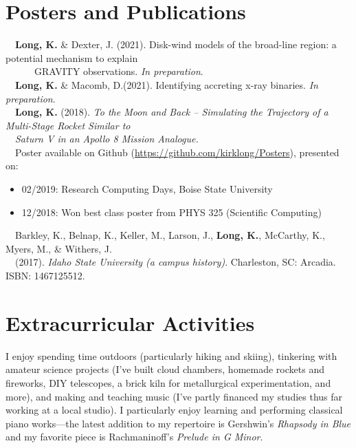 \documentclass[11pt]{article}
\begin{document}
\section{Posters and Publications}
\-\ \-\ \textbf{Long, K.} \& Dexter, J. (2021). Disk-wind models of the broad-line region: a potential mechanism to explain \\
\-\ \-\ \-\ \-\ \-\ \-\ GRAVITY observations. \textit{In preparation}.\vspace{1mm} \\
\-\ \-\ \textbf{Long, K.} \& Macomb, D.(2021). Identifying accreting x-ray binaries. \textit{In preparation}.\vspace{1mm} \\
\-\ \-\ \textbf{Long, K.} (2018). \textit{To the Moon and Back -- Simulating the Trajectory of a Multi-Stage Rocket Similar to} \\
\-\ \-\ \textit{Saturn V in an Apollo 8 Mission Analogue.}\vspace{1mm}\\
\-\ \-\ Poster available on Github (\url{https://github.com/kirklong/Posters}), presented on:
\-\ \-\ \begin{itemize}[noitemsep]
              \item 02/2019: Research Computing Days, Boise State University
              \item 12/2018: Won best class poster from PHYS 325 (Scientific Computing)
        \end{itemize}
\-\ \-\ Barkley, K., Belnap, K., Keller, M., Larson, J., \textbf{Long, K.}, McCarthy, K., Myers, M., \& Withers, J. \\
 \-\ \-\ (2017). \textit{Idaho State University (a campus history)}. Charleston, SC: Arcadia. ISBN: 1467125512.

\section{Extracurricular Activities}
I enjoy spending time outdoors (particularly hiking and skiing), tinkering with amateur science projects (I've built cloud chambers, homemade rockets and fireworks, DIY telescopes, a brick kiln for metallurgical experimentation, and more), and making and teaching music (I've partly financed my studies thus far working at a local studio). I particularly enjoy learning and performing classical piano works---the latest addition to my repertoire is Gershwin's \textit{Rhapsody in Blue} and my favorite piece is Rachmaninoff's \textit{Prelude in G Minor}.
\end{document}
